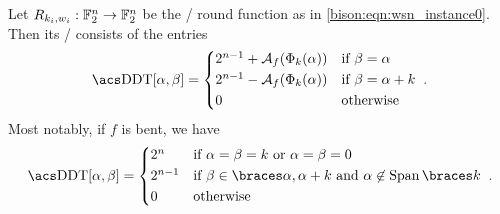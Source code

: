\begin{proposition}\label{prop:wsn:ddt}
    Let $R_{k_i,w_i} : \mathbb{F}_2^n \to \mathbb{F}_2^n$ be the \WSN/ round function as in \cref{bison:eqn:wsn_instance0}.
    Then its \DDT/ consists of the entries
    \begin{equation}
        \mathrm{\DDTs/}[\alpha,\beta] = \begin{cases*}
            2^{n-1} + \AC{f}(\Phi_k(\alpha)) & if $\beta = \alpha$  \\
            2^{n-1} - \AC{f}(\Phi_k(\alpha)) & if $\beta = \alpha+k$\\
                    0                        & otherwise
            \end{cases*}\;.
    \end{equation}
    Most notably, if $f$ is bent, we have
    \begin{equation*}
        \mathrm{\DDTs/}[\alpha,\beta] = \begin{cases*}
            2^n     & if $\alpha = \beta = k$ or $\alpha = \beta = 0$ \\
            2^{n-1} & if $\beta \in \set{\alpha, \alpha + k}$ and $\alpha \not \in \Span{k}$\\
            0       & otherwise
        \end{cases*}\;.
    \end{equation*}
\end{proposition}
